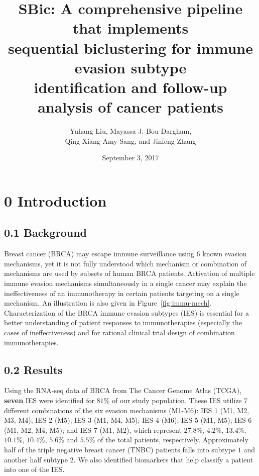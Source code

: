 \documentclass[a4paper, 11pt]{article}
\title{\bf SBic: A comprehensive pipeline that implements\\
  sequential biclustering for immune evasion subtype\\
  identification and follow-up analysis of cancer patients}
\author{Yuhang Liu, Mayassa J. Bou-Dargham,\\ 
  Qing-Xiang Amy Sang, and Jinfeng Zhang}
\begin{document}
\date{September 3, 2017}
\maketitle
\setlength{\parindent}{0pt}
\section*{0 Introduction}
\subsection*{0.1 Background}
Breast cancer (BRCA) may escape immune surveillance using $6$ known evasion mechanisms, yet it is not fully understood which mechanism or combination of mechanisms are used by subsets of human BRCA patients. Activation of multiple immune evasion mechanisms simultaneously in a single cancer may explain the ineffectiveness of an immunotherapy in certain patients targeting on a single mechanism. An illustration is also given in Figure~\ref{fig:immu-mech}. Characterization of the BRCA immune evasion subtypes (IES) is essential for a better understanding of patient responses to immunotherapies (especially the cases of ineffectiveness) and for rational clinical trial design of combination immunotherapies.

\subsection*{0.2 Results}
Using the RNA-seq data of BRCA from The Cancer Genome Atlas (TCGA), \textbf{seven} IES were identified for $81$\% of our study population. These IES utilize $7$ different combinations of the six evasion mechanisms (M1-M6): IES 1 (M1, M2, M3, M4); IES 2 (M5); IES 3 (M1, M4, M5); IES 4 (M6); IES 5 (M1, M5); IES 6 (M1, M2, M4, M5); and IES 7 (M1, M2), which represent $27.8$\%, $4.2$\%, $13.4$\%, $10.1$\%, $10.4$\%, $5.6$\% and $5.5$\% of the total patients, respectively. Approximately half of the triple negative breast cancer (TNBC) patients falls into subtype $1$ and another half subtype $2$. We also identified biomarkers that help classify a patient into one of the IES.
\end{document}
